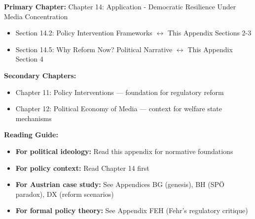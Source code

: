 \begin{tcolorbox}[colback=purple!5!white, colframe=purple!75!black,
    title=Chapter Linkage]

\textbf{Primary Chapter:} Chapter 14: Application - Democratic Resilience Under Media Concentration

\begin{itemize}[nosep]
\item Section 14.2: Policy Intervention Frameworks $\leftrightarrow$ This Appendix Sections 2-3
\item Section 14.5: Why Reform Now? Political Narrative $\leftrightarrow$ This Appendix Section 4
\end{itemize}

\textbf{Secondary Chapters:}
\begin{itemize}[nosep]
\item Chapter 11: Policy Interventions --- foundation for regulatory reform
\item Chapter 12: Political Economy of Media --- context for welfare state mechanisms
\end{itemize}

\textbf{Reading Guide:}
\begin{itemize}[nosep]
\item \textbf{For political ideology:} Read this appendix for normative foundations
\item \textbf{For policy context:} Read Chapter 14 first
\item \textbf{For Austrian case study:} See Appendices BG (genesis), BH (SPÖ paradox), DX (reform scenarios)
\item \textbf{For formal policy theory:} See Appendix FEH (Fehr's regulatory critique)
\end{itemize}

\end{tcolorbox}



